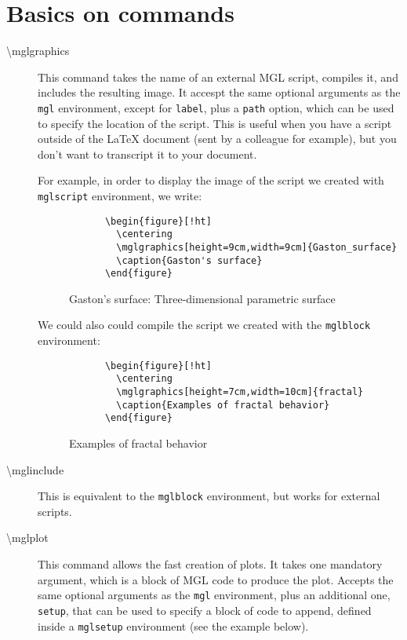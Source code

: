 \documentclass{article}
\begin{document}
	\section{Basics on commands}
	\begin{description}
		\item[\textbackslash mglgraphics] This command takes the name of an external MGL script, compiles it, and includes the resulting image. It accespt the same optional arguments as the \verb|mgl| environment, except for \verb|label|, plus a \verb|path| option, which can be used to specify the location of the script. This is useful when you have a script outside of the \LaTeX{} document (sent by a colleague for example), but you don't want to transcript it to your document.
		
		For example, in order to display the image of the script we created with \verb|mglscript| environment, we write:
		\begin{verbatim}
			\begin{figure}[!ht]
			  \centering
			  \mglgraphics[height=9cm,width=9cm]{Gaston_surface}
			  \caption{Gaston's surface}
			\end{figure}
		\end{verbatim}
		\begin{figure}[!ht]
			\centering
			\caption{Gaston's surface: Three-dimensional parametric surface}
		\end{figure}
		
		We could also could compile the script we created with the \verb|mglblock| environment:
		\begin{verbatim}
			\begin{figure}[!ht]
			  \centering
			  \mglgraphics[height=7cm,width=10cm]{fractal}
			  \caption{Examples of fractal behavior}
			\end{figure}
		\end{verbatim}
		\begin{figure}[!ht]
			\centering
			\caption{Examples of fractal behavior}
		\end{figure}
		
		\item[\textbackslash mglinclude] This is equivalent to the \verb|mglblock| environment, but works for external scripts.
		
		\item[\textbackslash mglplot] This command allows the fast creation of plots. It takes one mandatory argument, which is a block of MGL code to produce the plot. Accepts the same optional arguments as the \verb|mgl| environment, plus an additional one, \verb|setup|, that can be used to specify a block of code to append, defined inside a \verb|mglsetup| environment (see the example below).
		

\end{description}
\end{document}
